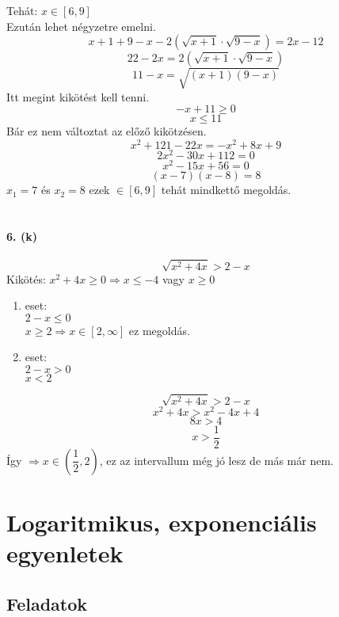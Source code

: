 \documentclass[12pt,a4paper,fleqn]{article}
\newcommand{\myparagraph}[1]{\paragraph{#1}\mbox{}}
\begin{document}
Tehát: $x \in [6, 9]$ \\
Ezután lehet négyzetre emelni.
$$ x+1+9-x-2(\sqrt{x+1} \cdot \sqrt{9-x}) = 2x-12 $$
$$ 22-2x = 2(\sqrt{x+1} \cdot \sqrt{9-x}) $$
$$ 11-x = \sqrt{(x+1)(9-x)} $$
Itt megint kikötést kell tenni.
$$ -x + 11 \geq 0 $$
$$ x \leq 11 $$
Bár ez nem változtat az előző kikötzésen.
$$ x^2 + 121 - 22x = -x^2 + 8x + 9 $$
$$ 2x^2 -30x +112 = 0 $$
$$ x^2 -15x +56 = 0 $$
$$ (x-7)(x-8) = 8 $$
$ x_1 = 7 $ és $ x_2=8 $ ezek $\in [6,9]$ tehát mindkettő megoldás. \\\\
\myparagraph{6. (k)}
$$\sqrt{x^2+4x} > 2-x$$
Kikötés: $ x^2 +4x \geq 0 \Rightarrow x \leq -4$ vagy $x \geq 0$
\begin{enumerate}
  \item eset: \\
  $2-x \leq 0$ \\
  $x \geq 2 \Rightarrow x \in [2, \infty]$ ez megoldás.
  \item eset: \\
  $ 2-x > 0 $ \\
  $ x < 2 $
\end{enumerate}
$$ \sqrt{x^2+4x} > 2-x $$
$$ x^2 + 4x > x^2 - 4x +4 $$
$$ 8x > 4 $$
$$ x > \dfrac{1}{2} $$
Így $ \Rightarrow x \in \left(\dfrac{1}{2}, 2\right)$, ez az intervallum még jó lesz de más már nem.

\section{Logaritmikus, exponenciális egyenletek}
\setcounter{subsection}{1}
\subsection{Feladatok}
\end{document}
